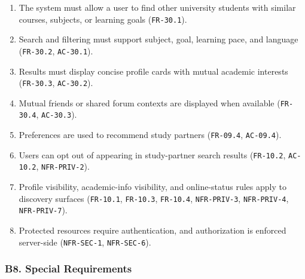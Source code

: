\documentclass[12pt]{article}
\begin{document}
\begin{enumerate}
\item The system must allow a user to find other university students with similar courses, subjects, or learning goals (\texttt{FR-30.1}).
\item Search and filtering must support subject, goal, learning pace, and language (\texttt{FR-30.2}, \texttt{AC-30.1}).
\item Results must display concise profile cards with mutual academic interests (\texttt{FR-30.3}, \texttt{AC-30.2}).
\item Mutual friends or shared forum contexts are displayed when available (\texttt{FR-30.4}, \texttt{AC-30.3}).
\item Preferences are used to recommend study partners (\texttt{FR-09.4}, \texttt{AC-09.4}).
\item Users can opt out of appearing in study-partner search results (\texttt{FR-10.2}, \texttt{AC-10.2}, \texttt{NFR-PRIV-2}).
\item Profile visibility, academic-info visibility, and online-status rules apply to discovery surfaces (\texttt{FR-10.1}, \texttt{FR-10.3}, \texttt{FR-10.4}, \texttt{NFR-PRIV-3}, \texttt{NFR-PRIV-4}, \texttt{NFR-PRIV-7}).
\item Protected resources require authentication, and authorization is enforced server-side (\texttt{NFR-SEC-1}, \texttt{NFR-SEC-6}).
\end{enumerate}
\par\medskip

\hypertarget{sec:b8-special-requirements}{}
\subsubsection*{B8. Special Requirements}
\par\medskip
\end{document}
